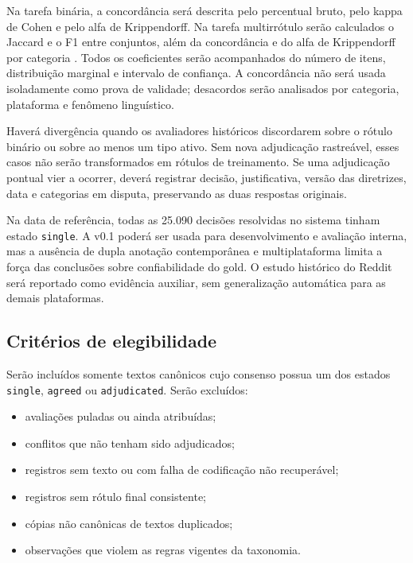 Na tarefa binária, a concordância será descrita pelo percentual bruto, pelo
kappa de Cohen e pelo alfa de Krippendorff. Na tarefa multirrótulo serão
calculados o Jaccard e o F1 entre conjuntos, além da concordância e do alfa de
Krippendorff por categoria \cite{cohen1960kappa,krippendorff2018content}. Todos
os coeficientes serão acompanhados do número de
itens, distribuição marginal e intervalo de confiança. A concordância não será
usada isoladamente como prova de validade; desacordos serão analisados por
categoria, plataforma e fenômeno linguístico.

Haverá divergência quando os avaliadores históricos discordarem sobre o rótulo
binário ou sobre ao menos um tipo ativo. Sem nova adjudicação rastreável, esses
casos não serão transformados em rótulos de treinamento. Se uma adjudicação
pontual vier a ocorrer, deverá registrar decisão, justificativa, versão das
diretrizes, data e categorias em disputa, preservando as duas respostas originais.

Na data de referência, todas as 25.090 decisões resolvidas no sistema tinham
estado \texttt{single}. A v0.1 poderá ser usada para desenvolvimento e avaliação
interna, mas a ausência de dupla anotação contemporânea e multiplataforma limita
a força das conclusões sobre confiabilidade do gold. O estudo histórico do Reddit
será reportado como evidência auxiliar, sem generalização automática para as
demais plataformas.

\subsection{Critérios de elegibilidade}

Serão incluídos somente textos canônicos cujo consenso possua um dos estados
\texttt{single}, \texttt{agreed} ou \texttt{adjudicated}. Serão excluídos:

\begin{itemize}
    \item avaliações puladas ou ainda atribuídas;
    \item conflitos que não tenham sido adjudicados;
    \item registros sem texto ou com falha de codificação não recuperável;
    \item registros sem rótulo final consistente;
    \item cópias não canônicas de textos duplicados;
    \item observações que violem as regras vigentes da taxonomia.
\end{itemize}

